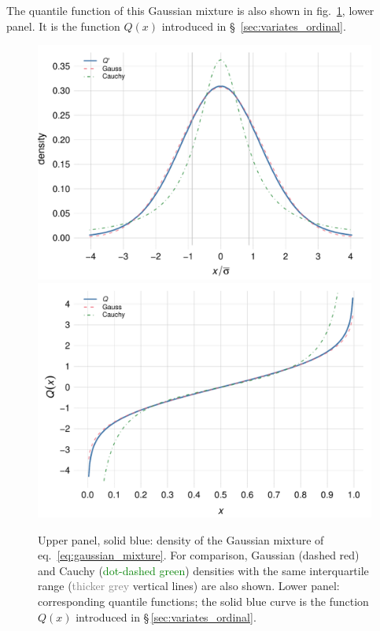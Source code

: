 \documentclass[\ifafour a4paper,12pt,\else a5paper,10pt,\fi%
onecolumn,oneside,article,%
british%
]{memoir}
\theoremstyle{remark}
\theoremstyle{innote}
\renewcommand*{\|}[1][]{\nonscript\:#1\vert\nonscript\:\mathopen{}}
\newcommand*{\sect}{\S}%
\newcommand*{\eqn}{eq.}%
\newcommand*{\fig}{fig.}%
\begin{document}
The quantile function of this Gaussian mixture is also shown in \fig~\ref{fig:gaussmix}, lower panel. It is the function $Q(x)$ introduced in \sect~\ref{sec:variates_ordinal}.

\begin{figure}
\centering\includegraphics[width=0.875\linewidth]{Gaussmix.pdf}\\%
\includegraphics[width=0.875\linewidth]{Qfunction2.pdf}%
\\
\caption{Upper panel, \textcolor{bluepurple}{solid blue}: density of the Gaussian mixture of \eqn~\eqref{eq:gaussian_mixture}. For comparison, Gaussian (\textcolor{redpurple}{dashed red}) and  Cauchy (\textcolor{green}{dot-dashed green})%
  densities with the same interquartile range (\textcolor{grey}{thicker grey} vertical lines) are also shown. Lower panel: corresponding quantile functions; the \textcolor{bluepurple}{solid blue} curve is the function $Q(x)$ introduced in \sect\,\ref{sec:variates_ordinal}.}\label{fig:gaussmix}
\end{figure}
\end{document}
